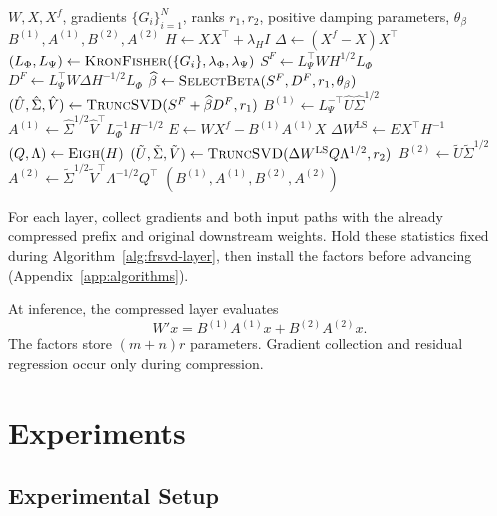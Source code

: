 \documentclass[11pt]{article}
\begin{document}
\begin{algorithm}[t]
\caption{FR-SVD for one weight matrix}
\label{alg:frsvd-layer}
\small
\begin{algorithmic}[1]
\Require $W,X,X^f$, gradients $\{G_i\}_{i=1}^N$, ranks $r_1,r_2$, positive damping parameters, $\theta_\beta$
\Ensure $B^{(1)},A^{(1)},B^{(2)},A^{(2)}$
\State $H\gets XX^\top+\lambda_H I$
\State $\Delta\gets(X^f-X)X^\top$
\State $(L_\Phi,L_\Psi)\gets\Call{KronFisher}{\{G_i\},\lambda_\Phi,\lambda_\Psi}$
\State $S^F\gets L_\Psi^\top WH^{1/2}L_\Phi$
\State $D^F\gets L_\Psi^\top W\Delta H^{-1/2}L_\Phi$
\State $\widehat\beta\gets\Call{SelectBeta}{S^F,D^F,r_1,\theta_\beta}$
\State $(\hat U,\hat\Sigma,\hat V)\gets\Call{TruncSVD}{S^F+\widehat\beta D^F,r_1}$
\State $B^{(1)}\gets L_\Psi^{-\top}\hat U\hat\Sigma^{1/2}$
\State $A^{(1)}\gets\hat\Sigma^{1/2}\hat V^\top L_\Phi^{-1}H^{-1/2}$
\EndStage
{}
\State $E\gets WX^f-B^{(1)}A^{(1)}X$
\State $\Delta W^{\mathrm{LS}}\gets EX^\top H^{-1}$
\State $(Q,\Lambda)\gets\Call{Eigh}{H}$
\State $(\tilde U,\tilde\Sigma,\tilde V)\gets\Call{TruncSVD}{\Delta W^{\mathrm{LS}}Q\Lambda^{1/2},r_2}$
\State $B^{(2)}\gets\tilde U\tilde\Sigma^{1/2}$
\State $A^{(2)}\gets\tilde\Sigma^{1/2}\tilde V^\top\Lambda^{-1/2}Q^\top$
\EndStage
\State \Return $(B^{(1)},A^{(1)},B^{(2)},A^{(2)})$
\end{algorithmic}
\end{algorithm}

For each layer, collect gradients and both input paths with the already compressed prefix and original downstream weights. Hold these statistics fixed during Algorithm~\ref{alg:frsvd-layer}, then install the factors before advancing (Appendix~\ref{app:algorithms}).

At inference, the compressed layer evaluates
\begin{equation}
W'x=B^{(1)}A^{(1)}x+B^{(2)}A^{(2)}x.
\label{eq:deployment}
\end{equation}
The factors store $(m+n)r$ parameters. Gradient collection and residual regression occur only during compression.

\section{Experiments}\label{sec:experiments}



\subsection{Experimental Setup}
\end{document}
